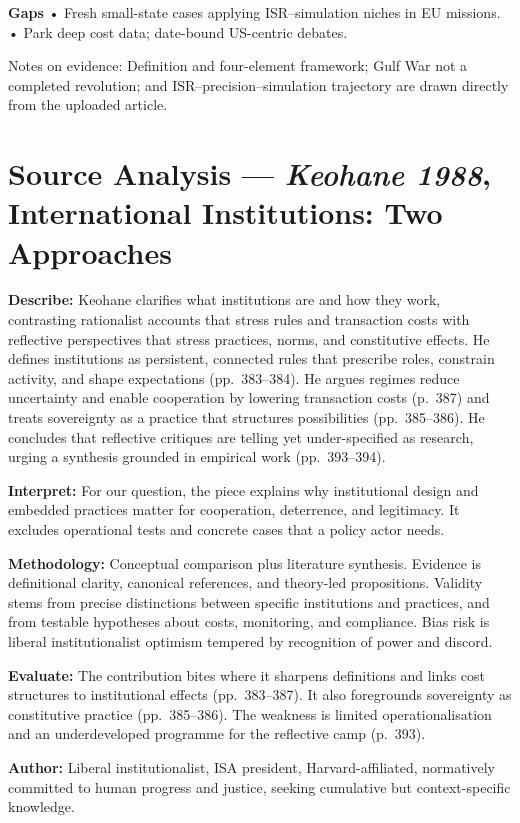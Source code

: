 \textbf{Gaps}
• Fresh small-state cases applying ISR–simulation niches in EU missions.
• Park deep cost data; date-bound US-centric debates.

Notes on evidence: Definition and four-element framework; Gulf War not a completed revolution; and ISR–precision–simulation trajectory are drawn directly from the uploaded article.

\parencite{KEOHANE_1988
}

\section*{Source Analysis — \textit{Keohane 1988}, International Institutions: Two Approaches}

\textbf{Describe:} Keohane clarifies what institutions are and how they work, contrasting rationalist accounts that stress rules and transaction costs with reflective perspectives that stress practices, norms, and constitutive effects. He defines institutions as persistent, connected rules that prescribe roles, constrain activity, and shape expectations (pp.~383--384). He argues regimes reduce uncertainty and enable cooperation by lowering transaction costs (p.~387) and treats sovereignty as a practice that structures possibilities (pp.~385--386). He concludes that reflective critiques are telling yet under-specified as research, urging a synthesis grounded in empirical work (pp.~393--394).

\textbf{Interpret:} For our question, the piece explains why institutional design and embedded practices matter for cooperation, deterrence, and legitimacy. It excludes operational tests and concrete cases that a policy actor needs.

\textbf{Methodology:} Conceptual comparison plus literature synthesis. Evidence is definitional clarity, canonical references, and theory-led propositions. Validity stems from precise distinctions between specific institutions and practices, and from testable hypotheses about costs, monitoring, and compliance. Bias risk is liberal institutionalist optimism tempered by recognition of power and discord.

\textbf{Evaluate:} The contribution bites where it sharpens definitions and links cost structures to institutional effects (pp.~383--387). It also foregrounds sovereignty as constitutive practice (pp.~385--386). The weakness is limited operationalisation and an underdeveloped programme for the reflective camp (p.~393).

\textbf{Author:} Liberal institutionalist, ISA president, Harvard-affiliated, normatively committed to human progress and justice, seeking cumulative but context-specific knowledge.

